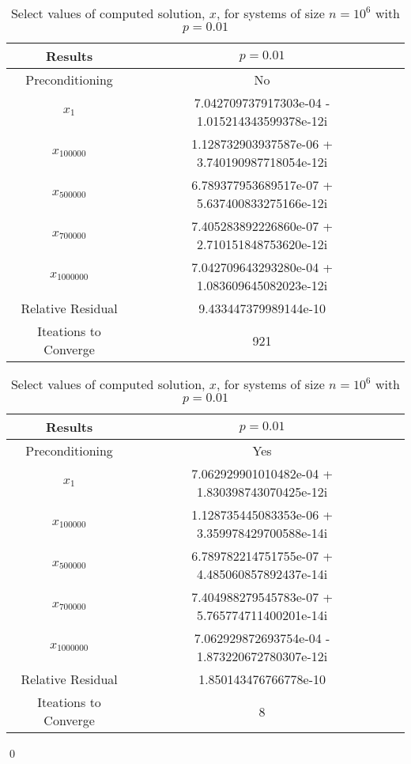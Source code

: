 \documentclass[12pt]{article}
\begin{document}
\begin{itemize}
\begin{table}[H]
\centering
\renewcommand{\arraystretch}{1.3}
\begin{small}
\begin{tabular}{| c || c | c |}
\hline
\textbf{Results} &  $p = 0.01$  \\
\hline 
\hline
Preconditioning & No \\
\hline
$x_1$ & 7.042709737917303e-04 - 1.015214343599378e-12i \\
$x_{100000}$ &  1.128732903937587e-06 + 3.740190987718054e-12i \\
$x_{500000}$ &  6.789377953689517e-07 + 5.637400833275166e-12i  \\
$x_{700000}$ &  7.405283892226860e-07 + 2.710151848753620e-12i  \\
$x_{1000000}$ &  7.042709643293280e-04 + 1.083609645082023e-12i  \\
\hline
Relative Residual & 9.433447379989144e-10  \\
\hline
Iteations to Converge &  921 \\
\hline
\end{tabular}
\end{small}
\caption{Select values of computed solution, $x$, for systems of size $n=10^6$ with $p=0.01$}
\end{table}

\begin{table}[H]
\centering
\renewcommand{\arraystretch}{1.3}
\begin{small}
\begin{tabular}{| c || c | c |}
\hline
\textbf{Results} &  $p = 0.01$   \\
\hline 
\hline
Preconditioning & Yes \\
\hline
$x_1$ &  7.062929901010482e-04 + 1.830398743070425e-12i  \\
$x_{100000}$ &  1.128735445083353e-06 + 3.359978429700588e-14i  \\
$x_{500000}$ &  6.789782214751755e-07 + 4.485060857892437e-14i  \\
$x_{700000}$ &  7.404988279545783e-07 + 5.765774711400201e-14i  \\
$x_{1000000}$ &  7.062929872693754e-04 - 1.873220672780307e-12i
  \\
\hline
Relative Residual &  1.850143476766778e-10 \\
\hline
Iteations to Converge & 8 \\
\hline
\end{tabular}
\end{small}
\caption{Select values of computed solution, $x$, for systems of size $n=10^6$ with $p=0.01$}
\end{table}



\qed
















\end{itemize}
\end{document}
